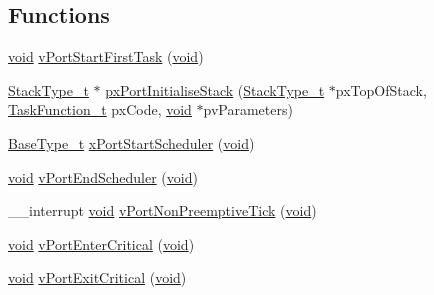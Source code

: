 \subsection*{Functions}
\begin{DoxyCompactItemize}
\item 
\hyperlink{Paradigm_2Tern__EE_2small_2portmacro_8h_a14d32f8130d3c0b212cfc751730b5b49}{void} \hyperlink{CCS_2ARM__Cortex-R4_2port_8c_a5cfc38319f17c8e804020ec247b6325d}{v\-Port\-Start\-First\-Task} (\hyperlink{Paradigm_2Tern__EE_2small_2portmacro_8h_a14d32f8130d3c0b212cfc751730b5b49}{void})
\item 
\hyperlink{Flsh186_2prtmacro_8h_a84e9a8ba132feed0b2401c1f4e2ac63c}{Stack\-Type\-\_\-t} $\ast$ \hyperlink{CCS_2ARM__Cortex-R4_2port_8c_a474fbbb58ea661a1557f05adc41120c1}{px\-Port\-Initialise\-Stack} (\hyperlink{Flsh186_2prtmacro_8h_a84e9a8ba132feed0b2401c1f4e2ac63c}{Stack\-Type\-\_\-t} $\ast$px\-Top\-Of\-Stack, \hyperlink{projdefs_8h_a24177544ba9c507a9429d6d5761eb487}{Task\-Function\-\_\-t} px\-Code, \hyperlink{Paradigm_2Tern__EE_2small_2portmacro_8h_a14d32f8130d3c0b212cfc751730b5b49}{void} $\ast$pv\-Parameters)
\item 
\hyperlink{Flsh186_2prtmacro_8h_ac826f39420fcf5b32ba7123a1d243f99}{Base\-Type\-\_\-t} \hyperlink{CCS_2ARM__Cortex-R4_2port_8c_ade5a8c6666e7413a0355cc252029c5c6}{x\-Port\-Start\-Scheduler} (\hyperlink{Paradigm_2Tern__EE_2small_2portmacro_8h_a14d32f8130d3c0b212cfc751730b5b49}{void})
\item 
\hyperlink{Paradigm_2Tern__EE_2small_2portmacro_8h_a14d32f8130d3c0b212cfc751730b5b49}{void} \hyperlink{CCS_2ARM__Cortex-R4_2port_8c_af76f3c0b44c5b5c06fc046a4ee1a6423}{v\-Port\-End\-Scheduler} (\hyperlink{Paradigm_2Tern__EE_2small_2portmacro_8h_a14d32f8130d3c0b212cfc751730b5b49}{void})
\item 
\-\_\-\-\_\-interrupt \hyperlink{Paradigm_2Tern__EE_2small_2portmacro_8h_a14d32f8130d3c0b212cfc751730b5b49}{void} \hyperlink{CCS_2ARM__Cortex-R4_2port_8c_aa3d36248da898dd1d2ae1784c76bdb9c}{v\-Port\-Non\-Preemptive\-Tick} (\hyperlink{Paradigm_2Tern__EE_2small_2portmacro_8h_a14d32f8130d3c0b212cfc751730b5b49}{void})
\item 
\hyperlink{Paradigm_2Tern__EE_2small_2portmacro_8h_a14d32f8130d3c0b212cfc751730b5b49}{void} \hyperlink{CCS_2ARM__Cortex-R4_2port_8c_a2ed3554a3de09a3bd09d396ee081ab69}{v\-Port\-Enter\-Critical} (\hyperlink{Paradigm_2Tern__EE_2small_2portmacro_8h_a14d32f8130d3c0b212cfc751730b5b49}{void})
\item 
\hyperlink{Paradigm_2Tern__EE_2small_2portmacro_8h_a14d32f8130d3c0b212cfc751730b5b49}{void} \hyperlink{CCS_2ARM__Cortex-R4_2port_8c_aed20ada05b957181a0de042802a82a5b}{v\-Port\-Exit\-Critical} (\hyperlink{Paradigm_2Tern__EE_2small_2portmacro_8h_a14d32f8130d3c0b212cfc751730b5b49}{void})
\end{DoxyCompactItemize}
